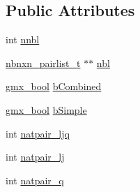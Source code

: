 \subsection*{\-Public \-Attributes}
\begin{DoxyCompactItemize}
\item 
int \hyperlink{structnbnxn__pairlist__set__t_aed2502691ae20f7d1ae63557c14fd05f}{nnbl}
\item 
\hyperlink{structnbnxn__pairlist__t}{nbnxn\-\_\-pairlist\-\_\-t} $\ast$$\ast$ \hyperlink{structnbnxn__pairlist__set__t_ae082333a5bb2e59f859b2db044ebec27}{nbl}
\item 
\hyperlink{include_2types_2simple_8h_a8fddad319f226e856400d190198d5151}{gmx\-\_\-bool} \hyperlink{structnbnxn__pairlist__set__t_a9bf81687d0feefc31c24264355eb36d6}{b\-Combined}
\item 
\hyperlink{include_2types_2simple_8h_a8fddad319f226e856400d190198d5151}{gmx\-\_\-bool} \hyperlink{structnbnxn__pairlist__set__t_ae91b9d55507dd184aa9054fb4fdea5a9}{b\-Simple}
\item 
int \hyperlink{structnbnxn__pairlist__set__t_a2c3c3d019f533dcbc6d7ea6bc196a35f}{natpair\-\_\-ljq}
\item 
int \hyperlink{structnbnxn__pairlist__set__t_a51bc9d0759f042a9f01dfbd5f2466dc8}{natpair\-\_\-lj}
\item 
int \hyperlink{structnbnxn__pairlist__set__t_ae6b529725cb3a4a2a7265beb60479430}{natpair\-\_\-q}
\end{DoxyCompactItemize}


